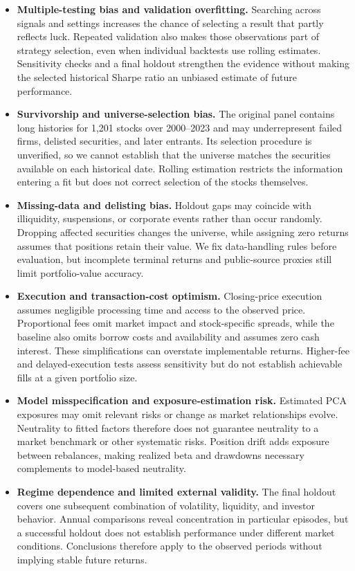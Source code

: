 \begin{itemize}
    \item \textbf{Multiple-testing bias and validation overfitting.}
    Searching across signals and settings increases the chance of selecting
    a result that partly reflects luck. Repeated validation also makes
    those observations part of strategy selection, even when individual
    backtests use rolling estimates. Sensitivity checks and a final holdout
    strengthen the evidence without making the selected historical Sharpe
    ratio an unbiased estimate of future performance.

    \item \textbf{Survivorship and universe-selection bias.} The original
    panel contains long histories for 1,201 stocks over 2000--2023 and may
    underrepresent failed firms, delisted securities, and later entrants.
    Its selection procedure is unverified, so we cannot establish that
    the universe matches the securities available on each historical date.
    Rolling estimation restricts the information entering a fit but does
    not correct selection of the stocks themselves.

    \item \textbf{Missing-data and delisting bias.} Holdout gaps may
    coincide with illiquidity, suspensions, or corporate events rather
    than occur randomly. Dropping affected securities changes the universe,
    while assigning zero returns assumes that positions retain their value.
    We fix data-handling rules before evaluation, but incomplete terminal
    returns and public-source proxies still limit portfolio-value accuracy.

    \item \textbf{Execution and transaction-cost optimism.} Closing-price
    execution assumes negligible processing time and access to the observed
    price. Proportional fees omit market impact and stock-specific spreads,
    while the baseline also omits borrow costs and availability and assumes
    zero cash interest. These simplifications can overstate implementable
    returns. Higher-fee and delayed-execution tests assess sensitivity but
    do not establish achievable fills at a given portfolio size.

    \item \textbf{Model misspecification and exposure-estimation risk.}
    Estimated PCA exposures may omit relevant risks or change as market
    relationships evolve. Neutrality to fitted factors therefore does not
    guarantee neutrality to a market benchmark or other systematic risks.
    Position drift adds exposure between rebalances, making realized beta
    and drawdowns necessary complements to model-based neutrality.

    \item \textbf{Regime dependence and limited external validity.} The
    final holdout covers one subsequent combination of volatility, liquidity,
    and investor behavior. Annual comparisons reveal concentration in
    particular episodes, but a successful holdout does not establish
    performance under different market conditions. Conclusions therefore
    apply to the observed periods without implying stable future returns.
\end{itemize}
